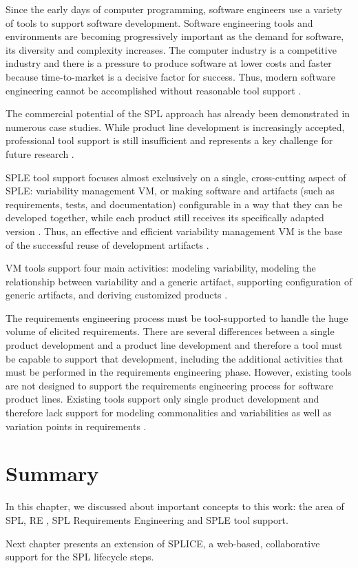 Since the early days of computer programming, software engineers use a variety of tools to support 
software development. Software engineering tools and environments are becoming progressively important 
as the demand for software, its diversity and complexity increases. The computer industry is a competitive 
industry and there is a pressure to produce software at lower costs and faster because time-to-market is a 
decisive factor for success. Thus, modern software engineering cannot be accomplished without reasonable 
tool support \citep{ossher2000software}.

The commercial potential of the \ac{SPL} approach has already been demonstrated in
numerous case studies. While product line development is increasingly accepted, professional 
tool support is still insufficient and represents a key challenge for future research 
\citep{Pohl2005,schmid2006requirements}.

\ac{SPLE} tool support focuses almost exclusively on a single, cross-cutting
aspect of \ac{SPLE}: variability management \ac{VM}, or making software and
artifacts (such as requirements, tests, and documentation) configurable in a way that they can be  developed together, while each 
product still receives its specifically adapted version \citep{schmid2013product}.  Thus, an effective 
and efficient variability management \ac{VM} is the base of the successful reuse of development 
artifacts \citep{boutkova2011experience}.

\acf{VM} tools support four main activities: modeling variability, modeling the
relationship between variability and a generic artifact, supporting configuration of generic artifacts, 
and deriving customized products \citep{schmid2013product}.

The requirements engineering process must be tool-supported to handle the huge
volume of elicited requirements. There are several differences between a single 
product development and a product line development and therefore a tool must be 
capable to support that development, including the additional activities that must be 
performed in the requirements engineering phase. However, existing tools are not designed 
to support the requirements engineering process for software product lines. Existing 
tools support only single product development and therefore lack support for modeling 
commonalities and variabilities as well as variation points in requirements
\citep{birk2003report}.

\section{Summary}
\label{sc:summary}

In this chapter, we discussed about important concepts to this work: the area of
\acf{SPL}, \acf{RE} , \ac{SPL} Requirements Engineering and \ac{SPLE} tool
support.

Next chapter presents an extension of \acf{SPLICE}, a web-based, collaborative
support for the \ac{SPL} lifecycle steps.

